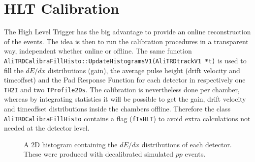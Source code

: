 \documentclass{alicetdr}
\begin{document}
\section{HLT Calibration}
The High Level Trigger has the big advantage to provide an online
reconstruction of the events. The idea is then to run the calibration
procedures in a transparent way, independent whether online or
offline. The same function
\\{\tt AliTRDCalibraFillHisto::UpdateHistogramsV1(AliTRDtrackV1 *t)}
is used to fill the $dE/dx$ distributions (gain), the average pulse
height (drift velocity and timeoffset) and the Pad Response Function
for each detector in respectively one {\tt TH2I} and two
{\tt TProfile2Ds}. The calibration is nevertheless done per chamber,
whereas by integrating statistics it will be possible to get the gain,
drift velocity and timeoffset distributions inside the chambers offline.
Therefore the class {\tt AliTRDCalibraFillHisto} contains a flag
({\tt fIsHLT}) to avoid extra calculations not needed at the detector
level.\\
\begin{figure}[hbt]
  \centering\mbox{}
  \caption{\label{referencech2d}A 2D histogram containing the
$dE$$/$$dx$ distributions of each detector. These were produced
with decalibrated simulated $pp$ events.}
\end{figure}
\end{document}
